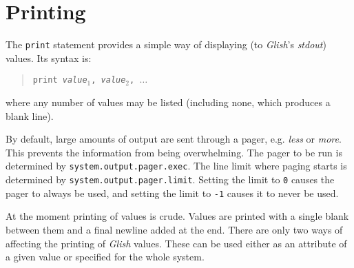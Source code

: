 \section{Printing}

The {\tt print} statement provides a simple way of displaying (to
{\em Glish}'s {\em stdout}) values.  Its syntax is:
\begin{quote}
    {\tt print {\em value$_1$}, {\em value$_2$}, $\ldots$}
\end{quote}
where any number of values may be listed (including none, which produces
a blank line).

\label{paged-output}
By default, large amounts of output are sent through a pager, e.g. {\em less}
or {\em more}. This prevents the information from being overwhelming.
The pager to be run is determined by \verb+system.output.pager.exec+.
The line limit where paging starts is determined by
\verb+system.output.pager.limit+. Setting the limit to {\tt 0} causes the
pager to always be used, and setting the limit to {\tt -1} causes it to never be
used.

At the moment printing of values is crude. Values are printed with a single
blank between them and a final newline added at the end.
There are only two ways of affecting the printing of {\em Glish}
values. 
These can be used either  as an attribute of a given value or 
specified for the whole system.

